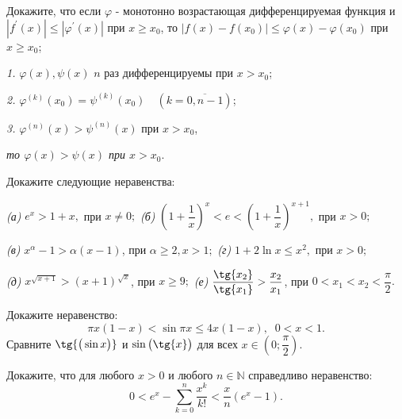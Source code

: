 \documentclass[10pt]{article}
\begin{document}
\begin{problem}
Докажите, что если $\varphi$ - монотонно возрастающая дифференцируемая функция и $|f^{\prime}(x)| \leqslant |\varphi^{\prime}(x)|$ при $x \geqslant x_0$, то $|f(x) - f(x_0)| \leqslant \varphi(x) - \varphi(x_0)$ при $x \geqslant x_0$;

 \emph{1.} $\varphi(x), \psi(x)$ $n$ раз дифференцируемы при $x > x_0$;

\emph{2.} $\varphi^{(k)}(x_0)=\psi^{(k)}(x_0) \quad (k = \overline{0, n-1})$;

\emph{3.} $\varphi^{(n)}(x) > \psi^{(n)}(x)$ при $x > x_0$,

\emph{то $\varphi(x) > \psi(x)$ при $x > x_0$}.
\end{problem}

\begin{problem}
Докажите следующие неравенства:
\vspace{2ex}

\emph{(а)} $e^x>1+x,$ при $x\neq 0;$ \hspace{15ex}
\emph{(б)} \! \!\!$\left(\!1+\dfrac{1}{x}\!\right)^x\!\!\!<\!e\!<\!\!\left(\!1+\dfrac{1}{x}\!\right)^{x+1}\!\!\!\!,$ при $x>0;$

 \vspace{2ex}

\emph{(в)} $x^\alpha-1>\alpha(x-1)$, при $\alpha \geqslant 2, x>1;$   \hspace{.5ex}
\emph{(г)} $1+2\ln{x}\leqslant x^2,$ при $x>0;$

 \vspace{2ex}

\emph{(д)}  $x^{\sqrt{x+1}}>(x + 1)^{\sqrt{x}}$, при $x\geqslant 9;$  \hspace{6.4ex}
\emph{(е)} $\dfrac{\tg{x_2}}{\tg{x_1}} > \dfrac{x_2}{x_1}$, при $0 < x_1 < x_2 < \dfrac{\pi}{2}.$
\end{problem}

\begin{problem}
  Докажите неравенство: 
$$\pi x (1 - x) < \sin{\pi x} \le 4x (1 - x), \;\; 0 < x < 1.$$
  Сравните $\tg{\big(\sin{x}\big)}$ и $\sin{\big(\tg{x}\big)}$ для всех $x \in \left(0; \dfrac{\pi}{2}\right).$
\vspace{-1ex}
\end{problem}

\begin{problem}
Докажите, что для любого $x > 0$ и любого $n \in \mathbb{N}$ справедливо неравенство:
$$
0 < e^x - \sum_{k = 0}^n \dfrac{x^k}{k!} < \dfrac{x}{n} (e^x - 1).
$$

\end{problem}
\end{document}
